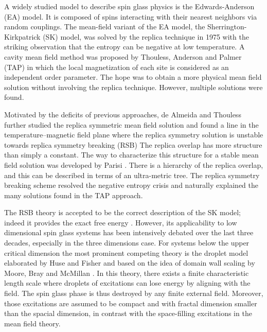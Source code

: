 \documentclass[aps,prb,twocolumn,showpacs,superscriptaddress]{revtex4}
\begin{document}
A widely studied model to describe spin glass physics is the Edwards-Anderson 
(EA) model\cite{Edwards-Anderson-1975}. It is composed of spins interacting
with their nearest neighbors via random couplings. The mean-field variant of the 
EA model, the Sherrington-Kirkpatrick (SK) model\cite{Sherrington-Kirkpatrick1978,Sherrington-Kirkpatrick-1975},
was solved by the replica technique in 1975 with the striking observation that 
the entropy can be negative at low temperature\cite{Sherrington-Kirkpatrick-1975,Sherrington-Kirkpatrick1978}. 
A cavity mean field method was proposed by Thouless, Anderson 
and Palmer (TAP) in which the local magnetization of each site is considered as 
an independent order parameter\cite{Thouless-Anderson-Palmer-1977}. The hope was to 
obtain a more physical mean field solution without involving the replica technique. 
However, multiple solutions were found\cite{Bray-Moore-1980}.

Motivated by the deficits of previous approaches, de Almeida and Thouless
further studied the replica symmetric mean field solution and found a line 
in the temperature--magnetic field plane where the replica symmetry
solution is unstable towards replica symmetry breaking (RSB) \cite{Almedia-Thouless-1978,Bray-Moore-1978}
The replica overlap has more structure than simply a constant. The way to 
characterize this structure for a stable mean field solution was developed 
by Parisi \cite{Parisi-1980a,Parisi-1980b,Parisi-1980c}.  There is a hierarchy 
of the replica overlap, and this can be described in terms of an ultra-metric tree. 
The replica symmetry breaking scheme resolved the negative entropy crisis and naturally 
explained the many solutions found in the TAP approach.

The RSB theory is accepted to be the correct description of the SK model; indeed 
it provides the exact free energy \cite{Talagrand-2006,Guerra-2003}. 
However, its applicability to low dimensional spin glass systems has been intensively debated 
over the last three decades, especially in the three dimensions case. For systems 
below the upper critical dimension \cite{Harris-Lubensky-Chen-1976,Tasaki-1989,Green-Moore-Bray-1983} 
the most prominent competing theory is the droplet model elaborated by 
Huse and Fisher \cite{Fisher-Huse-1988,Fisher-Huse-1987} and based on the idea of 
domain wall scaling by Moore, Bray and McMillan \cite{McMillan-1984,Bray-Moore-1987}. 
In this theory, there exists a finite characteristic length scale where droplets of 
excitations can lose energy by aligning with the field. The spin glass phase is thus 
destroyed by any finite external field. Moreover, those excitations are assumed to 
be compact and with fractal dimension smaller than the spacial dimension, in contrast 
with the space-filling excitations in the mean field theory. 
\end{document}
